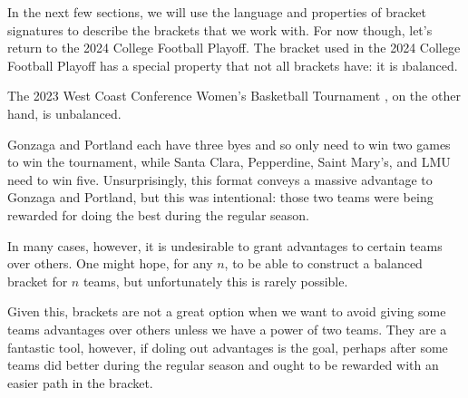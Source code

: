 {In the next few sections, we will use the language and properties of bracket signatures to describe the brackets that we work with. For now though, let's return to the 2024 College Football Playoff. The bracket used in the 2024 College Football Playoff has a special property that not all brackets have: it is \i{balanced}.


The 2023 West Coast Conference Women's Basketball Tournament \cite{wiki_wcc}, on the other hand, is unbalanced.

Gonzaga and Portland each have three byes and so only need to win two games to win the tournament, while Santa Clara, Pepperdine, Saint Mary's, and LMU need to win five. Unsurprisingly, this format conveys a massive advantage to Gonzaga and Portland, but this was intentional: those two teams were being rewarded for doing the best during the regular season.

In many cases, however, it is undesirable to grant advantages to certain teams over others. One might hope, for any $n$, to be able to construct a balanced bracket for $n$ teams, but unfortunately this is rarely possible.


Given this, brackets are not a great option when we want to avoid giving some teams advantages over others unless we have a power of two teams. They are a fantastic tool, however, if doling out advantages is the goal, perhaps after some teams did better during the regular season and ought to be rewarded with an easier path in the bracket.
}